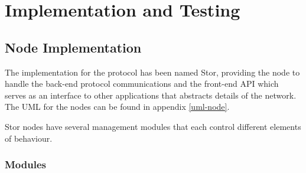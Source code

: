 \section{Implementation and Testing}
	\subsection{Node Implementation}
		The implementation for the protocol has been named Stor, providing the node to handle the back-end protocol communications and the front-end API which serves as an interface to other applications that abstracts details of the network. The UML for the nodes can be found in appendix \ref{uml-node}.
		
		Stor nodes have several management modules that each control different elements of behaviour.
		\subsubsection*{Modules}
		
